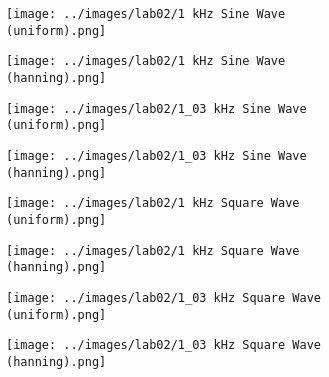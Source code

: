 \documentclass[12pt]{article}
\begin{document}
\begin{figure}[!ht]
    \centering
    \begin{subfigure}[h]{\textwidth}
    \texttt{[image: ../images/lab02/1 kHz Sine Wave (uniform).png]}
    \caption{}
    \label{fig:1 sine uniform}
    \end{subfigure}
    \begin{subfigure}[h]{\textwidth}
    \texttt{[image: ../images/lab02/1 kHz Sine Wave (hanning).png]}
    \caption{}
    \label{fig:1 sine hanning}
    \end{subfigure}
    \begin{subfigure}[h]{\textwidth}
    \texttt{[image: ../images/lab02/1\_03 kHz Sine Wave (uniform).png]}
    \caption{}
    \label{fig:1.03 sine uniform}
    \end{subfigure}
    \begin{subfigure}[h]{\textwidth}
    \texttt{[image: ../images/lab02/1\_03 kHz Sine Wave (hanning).png]}
    \caption{}
    \label{fig:1.03 sine hanning}
    \end{subfigure}
\end{figure} %

\begin{figure}[!ht]
    \centering
    \begin{subfigure}[h]{\textwidth}
    \texttt{[image: ../images/lab02/1 kHz Square Wave (uniform).png]}
    \caption{}
    \label{fig:1 square uniform}
    \end{subfigure}
    \begin{subfigure}[h]{\textwidth}
    \texttt{[image: ../images/lab02/1 kHz Square Wave (hanning).png]}
    \caption{}
    \label{fig:1 square hanning}
    \end{subfigure}
    \begin{subfigure}[h]{\textwidth}
    \texttt{[image: ../images/lab02/1\_03 kHz Square Wave (uniform).png]}
    \caption{}
    \label{fig:1.03 square uniform}
    \end{subfigure}
    \begin{subfigure}[h]{\textwidth}
    \texttt{[image: ../images/lab02/1\_03 kHz Square Wave (hanning).png]}
    \caption{}
    \label{fig:1.03 square hanning}
    \end{subfigure}
\end{figure} %
\end{document}
